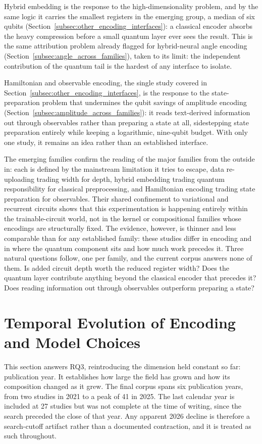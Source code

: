 \documentclass{ieeeaccess}
\begin{document}
Hybrid embedding is the response to the high-dimensionality problem, and by the same logic it carries the smallest registers in the emerging group, a median of six qubits (Section~\ref{subsec:other_encoding_interfaces}): a classical encoder absorbs the heavy compression before a small quantum layer ever sees the result. This is the same attribution problem already flagged for hybrid-neural angle encoding (Section~\ref{subsec:angle_across_families}), taken to its limit: the independent contribution of the quantum tail is the hardest of any interface to isolate.

Hamiltonian and observable encoding, the single study covered in Section~\ref{subsec:other_encoding_interfaces}, is the response to the state-preparation problem that undermines the qubit savings of amplitude encoding (Section~\ref{subsec:amplitude_across_families}): it reads text-derived information out through observables rather than preparing a state at all, sidestepping state preparation entirely while keeping a logarithmic, nine-qubit budget. With only one study, it remains an idea rather than an established interface.

The emerging families confirm the reading of the major families from the outside in: each is defined by the mainstream limitation it tries to escape, data re-uploading trading width for depth, hybrid embedding trading quantum responsibility for classical preprocessing, and Hamiltonian encoding trading state preparation for observables. Their shared confinement to variational and recurrent circuits shows that this experimentation is happening entirely within the trainable-circuit world, not in the kernel or compositional families whose encodings are structurally fixed. The evidence, however, is thinner and less comparable than for any established family: these studies differ in encoding and in where the quantum component sits and how much work precedes it. Three natural questions follow, one per family, and the current corpus answers none of them. Is added circuit depth worth the reduced register width? Does the quantum layer contribute anything beyond the classical encoder that precedes it? Does reading information out through observables outperform preparing a state?

\section{Temporal Evolution of Encoding and Model Choices}
\label{sec:temporal_evolution}

This section answers RQ3, reintroducing the dimension held constant so far: publication year. It establishes how large the field has grown and how its composition changed as it grew. The final corpus spans six publication years, from two studies in 2021 to a peak of 41 in 2025. The last calendar year is included at 27 studies but was not complete at the time of writing, since the search preceded the close of that year. Any apparent 2026 decline is therefore a search-cutoff artifact rather than a documented contraction, and it is treated as such throughout.
\end{document}
